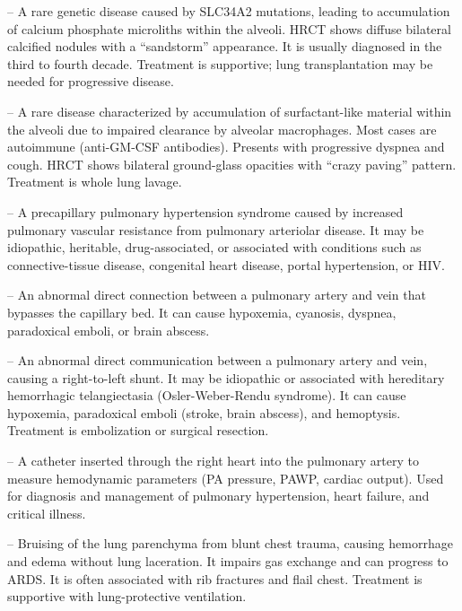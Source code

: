 -- A rare genetic disease caused by SLC34A2 mutations, leading to accumulation of calcium phosphate microliths within the alveoli. HRCT shows diffuse bilateral calcified nodules with a ``sandstorm'' appearance. It is usually diagnosed in the third to fourth decade. Treatment is supportive; lung transplantation may be needed for progressive disease.

-- A rare disease characterized by accumulation of surfactant-like material within the alveoli due to impaired clearance by alveolar macrophages. Most cases are autoimmune (anti-GM-CSF antibodies). Presents with progressive dyspnea and cough. HRCT shows bilateral ground-glass opacities with ``crazy paving'' pattern. Treatment is whole lung lavage.

-- A precapillary pulmonary hypertension syndrome caused by increased pulmonary vascular resistance from pulmonary arteriolar disease. It may be idiopathic, heritable, drug-associated, or associated with conditions such as connective-tissue disease, congenital heart disease, portal hypertension, or HIV.

-- An abnormal direct connection between a pulmonary artery and vein that bypasses the capillary bed. It can cause hypoxemia, cyanosis, dyspnea, paradoxical emboli, or brain abscess.

-- An abnormal direct communication between a pulmonary artery and vein, causing a right-to-left shunt. It may be idiopathic or associated with hereditary hemorrhagic telangiectasia (Osler-Weber-Rendu syndrome). It can cause hypoxemia, paradoxical emboli (stroke, brain abscess), and hemoptysis. Treatment is embolization or surgical resection.

-- A catheter inserted through the right heart into the pulmonary artery to measure hemodynamic parameters (PA pressure, PAWP, cardiac output). Used for diagnosis and management of pulmonary hypertension, heart failure, and critical illness.

-- Bruising of the lung parenchyma from blunt chest trauma, causing hemorrhage and edema without lung laceration. It impairs gas exchange and can progress to ARDS. It is often associated with rib fractures and flail chest. Treatment is supportive with lung-protective ventilation.

